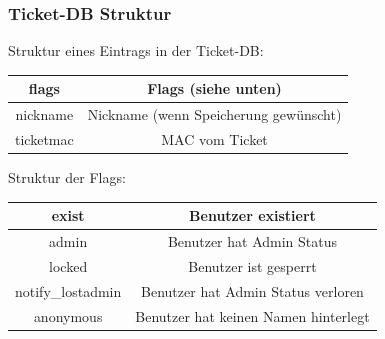 \begin{frame}
	\frametitle{Ticket-DB Struktur}
Struktur eines Eintrags in der Ticket-DB:
\begin{tabular}{|c|c|}
\hline flags     & Flags (siehe unten) \\ 
\hline nickname  & Nickname (wenn Speicherung gewünscht) \\ 
\hline ticketmac & MAC vom Ticket \\ 
\hline 
\end{tabular} 

\vspace{1cm}
Struktur der Flags:
\begin{tabular}{|c|c|}
\hline exist     & Benutzer existiert \\ 
\hline admin     & Benutzer hat Admin Status \\ 
\hline locked    & Benutzer ist gesperrt \\ 
\hline notify\_lostadmin & Benutzer hat Admin Status verloren\\
\hline anonymous & Benutzer hat keinen Namen hinterlegt \\
\hline 
\end{tabular} 
\end{frame}

